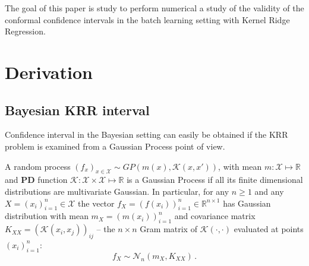 \documentclass[a4paper,14pt]{article}
\newcommand{\Ncal}{\mathcal{N}}
\newcommand{\Kcal}{\mathcal{K}}
\newcommand{\Xcal}{\mathcal{X}}
\newcommand{\Real}{\mathbb{R}}
\begin{document}
The goal of this paper is study to perform numerical a study of the validity of
the conformal confidence intervals in the batch learning setting with Kernel Ridge
Regression.



\section{Derivation} %
\label{sec:derivation}

\subsection{Bayesian KRR interval} %
\label{sub:bayesian_krr_interval}

Confidence interval in the Bayesian setting can easily be obtained if the KRR
problem is examined from a Gaussian Process point of view.

A random process $(f_x)_{x\in \Xcal} \sim GP(m(x), \Kcal(x,x'))$, with mean $m : \Xcal
\mapsto \Real$ and \textbf{PD} function $\Kcal : \Xcal \times \Xcal \mapsto \Real$
is a Gaussian Process if all its finite dimensional distributions are multivariate
Gaussian. In particular, for any $n\geq1$ and any $X = (x_i)_{i=1}^n \in \Xcal$ the
vector $f_X = (f(x_i))_{i=1}^n \in \Real^{n\times 1}$ has Gaussian distribution with
mean $m_X = (m(x_i))_{i=1}^n$ and covariance matrix $K_{XX} = (\Kcal(x_i,x_j))_{ij}$ --
the $n\times n$ Gram matrix of $\Kcal(\cdot,\cdot)$ evaluated at points $(x_i)_{i=1}^n$:
$$ f_X \sim \Ncal_n(m_X, K_{XX}) \,. $$
\end{document}
